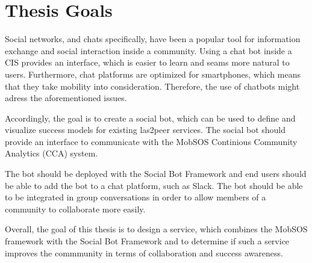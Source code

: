 \section{Thesis Goals}

Social networks, and chats specifically, have been a popular tool for information exchange and social interaction inside a community. Using a chat bot inside a CIS provides an interface, which is easier to learn and seams more natural to users. Furthermore, chat platforms are optimized for smartphones, which means that they take mobility into consideration. Therefore, the use of chatbots might adress the aforementioned issues.

Accordingly, the goal is to create a social bot, which can be used to define and visualize success models for existing las2peer services. The social bot should provide an interface to communicate with the MobSOS Continious Community Analytics (CCA) system.

The bot should be deployed with the Social Bot Framework and end users should be able to add the bot to a chat platform, such as Slack. The bot should be able to be integrated in group conversations in order to allow members of a community to collaborate more easily.

Overall, the goal of this thesis is to design a service, which combines the MobSOS framework with the Social Bot Framework and to determine if such a service improves the commmunity in terms of collaboration and success awareness.


\blankpage

